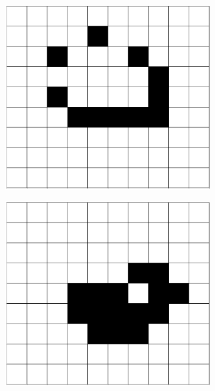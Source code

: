 \documentclass[12pt]{article}
\numberwithin{figure}{section} %
\begin{document}
\begin{figure}[H]
\begin{subfigure}{0.18\textwidth}
     		\centering
     		\includegraphics[width=\linewidth]{Section1/6.2}
     		\subcaption{}
   	\end{subfigure}
     	\begin{subfigure}{0.18\textwidth}
     		\centering
     		\includegraphics[width=\linewidth]{Section1/6.3}
     		\subcaption{}
   	\end{subfigure}
   	\begin{subfigure}{0.18\textwidth}

\end{subfigure}
\end{figure}
\end{document}
